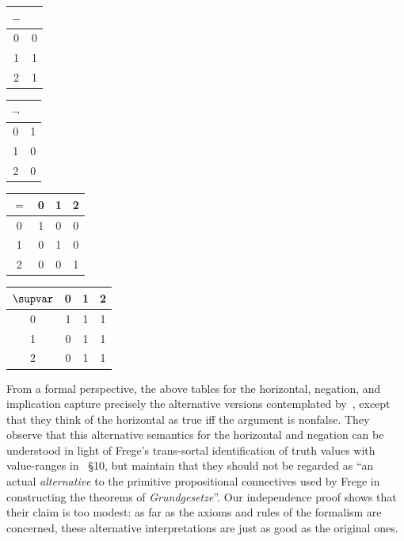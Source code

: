 \documentclass{preprint}
\renewcommand{\to}{\supvar}
\begin{document}

\begin{center}
	\begin{tabular}{c | c}
		$-$ &  \\
		\hline
		0 & 0  \\
		1 & 1 \\
		2 & 1 \\ 
	\end{tabular}
	\quad
	\begin{tabular}{c | c}
		$\neg$ &  \\
		\hline
		0 & 1  \\
		1 & 0 \\
		2 & 0 \\ 
	\end{tabular}
	\quad
	\begin{tabular}{c | c  c c}
		$=$ & 0 & 1 & 2 \\
		\hline
		0 & 1 & 0 & 0 \\
		1 & 0 & 1 & 0 \\
		2 & 0 & 0 & 1 \\ 
	\end{tabular}
	\quad
	\begin{tabular}{c | c  c c}
		$\to$ & 0 & 1 & 2 \\
		\hline
		0 & 1 & 1 & 1 \\
		1 & 0 & 1 & 1 \\
		2 & 0 & 1 & 1 \\ 
	\end{tabular}
\end{center}


From a formal perspective, the above tables for the horizontal, negation, and implication capture precisely the alternative versions contemplated by~\citet[\S4]{berg2017propositional}, except that they think of the horizontal as true iff the argument is nonfalse. 
They observe that this alternative semantics for the horizontal and negation can be understood in light of Frege's trans-sortal identification of truth values with value-ranges in \gga~\S10, but maintain that they should not be regarded as ``an actual \textit{alternative} to the primitive propositional connectives used by Frege in constructing the theorems of \textit{Grundgesetze}''. 
Our independence proof shows that their claim is too modest: as far as the axioms and rules of the formalism are concerned, these alternative interpretations are just as good as the original ones. 
\end{document}
